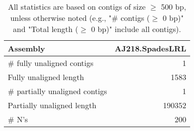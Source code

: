\documentclass[12pt,a4paper]{article}
\begin{document}
\begin{table}[ht]
\begin{center}
\caption{All statistics are based on contigs of size $\geq$ 500 bp, unless otherwise noted (e.g., "\# contigs ($\geq$ 0 bp)" and "Total length ($\geq$ 0 bp)" include all contigs).}
\begin{tabular}{|l*{1}{|r}|}
\hline
Assembly & AJ218.SpadesLRL \\ \hline
\# fully unaligned contigs & 1 \\ \hline
Fully unaligned length & 1583 \\ \hline
\# partially unaligned contigs & 1 \\ \hline
Partially unaligned length & 190352 \\ \hline
\# N's & 200 \\ \hline
\end{tabular}
\end{center}
\end{table}
\end{document}
